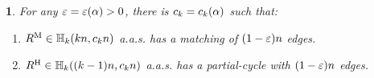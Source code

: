 \documentclass[11pt,english]{article}
\theoremstyle{plain}
\theoremstyle{definition}
\theoremstyle{definition}
\theoremstyle{plain}
\theoremstyle{plain}
\theoremstyle{plain}
\newtheorem{lem}[thm]{\protect\lemmaname}
\theoremstyle{plain}
\theoremstyle{remark}
\theoremstyle{remark}
\let\originalleft\left
\let\originalright\right
\renewcommand{\left}{\mathopen{}\mathclose\bgroup\originalleft}
\renewcommand{\right}{\aftergroup\egroup\originalright}
\providecommand{\lemmaname}{Lemma}
\begin{document}
\begin{lem}
\label{lem:hypergraph-almost-object}For any $\varepsilon=\varepsilon\left(\alpha\right)>0$, there is $\b=\b\left(\alpha\right)$ such that:

\begin{enumerate}[topsep=0px,label=(\alph*)]

\item{\label{itm:hypergraph-large-matching}$R^{\mathrm{M}}\in\HH_{k}\left(kn,\bmat n\right)$
a.a.s. has a matching of $\left(1-\varepsilon\right)n$ edges.}

\item{\label{itm:hypergraph-large-subcycle}$R^{\mathrm{H}}\in\HH_{k}\left(\left(k-1\right)n,\bham n\right)$
a.a.s. has a partial-cycle with $\left(1-\varepsilon\right)n$ edges.}

\end{enumerate}\end{lem}
\end{document}

